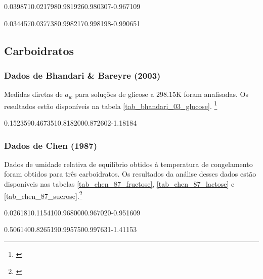%
	{0.039871}{0.021798}{0.981926}{0.980307}{-0.967109}

%
	{0.034457}{0.037738}{0.998217}{0.998198}{-0.990651}

\FloatBarrier

\subsection{Carboidratos}

\subsubsection{Dados de Bhandari \& Bareyre (2003)}

Medidas diretas de $a_w$ para soluções de glicose a 298.15K foram analisadas.
Os resultados estão disponíveis na tabela \ref{tab_bhandari_03_glucose}.
\footnote{\cite{bhandari2003}}

%
	{0.152359}{0.467351}{0.818200}{0.872602}{-1.18184}

\FloatBarrier

\subsubsection{Dados de Chen (1987)}

Dados de umidade relativa de equilíbrio obtidos à temperatura de congelamento
foram obtidos para três carboidratos. Os resultados da análise desses dados estão
disponíveis nas tabelas \ref{tab_chen_87_fructose}, \ref{tab_chen_87_lactose} e
\ref{tab_chen_87_sucrose}.\footnote{\cite{chen1987}}

%
	{0.026181}{0.115410}{0.968000}{0.967020}{-0.951609}

%
	{0.506140}{0.826519}{0.995750}{0.997631}{-1.41153}


